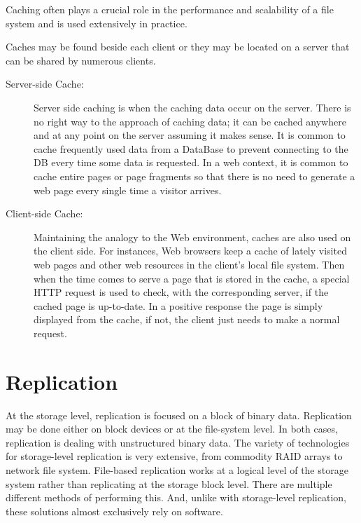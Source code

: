 Caching often plays a crucial role in the performance and scalability of a file system and is used extensively in practice.

Caches may be found beside each client or they may be located on a server that can be shared by numerous clients.

\begin{description}
	\item [Server-side Cache:] Server side caching is when the caching data occur on the server. There is no right way to the approach of caching data; it can be cached anywhere and at any point on the server assuming it makes sense. It is common to cache frequently used data from a DataBase to prevent connecting to the DB every time some data is requested. In a web context, it is common to cache entire pages or page fragments so that there is no need to generate a web page every single time a visitor arrives.
	\item [Client-side Cache:] Maintaining the analogy to the Web environment, caches are also used on the client side. For instances, Web browsers keep a cache of lately visited web pages and other web resources in the client’s local file system. Then when the time comes to serve a page that is stored in the cache, a special HTTP request is used to check, with the corresponding server, if the cached page is up-to-date. In a positive response the page is simply displayed from the cache, if not, the client just needs to make a normal request.
\end{description}

\newpage


\section{Replication}
\label{sec:replication}

At the storage level, replication is focused on a block of binary data. Replication may be done either on block devices or at the file-system level. In both cases, replication is dealing with unstructured binary data. The variety of technologies for storage-level replication is very extensive, from commodity RAID arrays to network file system.
File-based replication works at a logical level of the storage system rather than replicating at the storage block level. There are multiple different methods of performing this. And, unlike with storage-level replication, these solutions almost exclusively rely on software.

